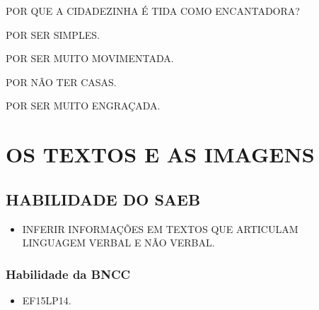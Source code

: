 POR QUE A CIDADEZINHA É TIDA COMO ENCANTADORA?

\begin{escolha}
\item POR SER SIMPLES.

\item POR SER MUITO MOVIMENTADA.

\item POR NÃO TER CASAS.

\item POR SER MUITO ENGRAÇADA.
\end{escolha}



\chapter{OS TEXTOS E AS IMAGENS}

\vspace{-1cm}

\section*{HABILIDADE DO SAEB}

\begin{itemize}
\item \uppercase{Inferir informações em textos que articulam linguagem verbal e não verbal.}
\end{itemize}

\vspace{-1cm}

\subsection{Habilidade da BNCC}

\begin{itemize}
\item EF15LP14.
\end{itemize}



